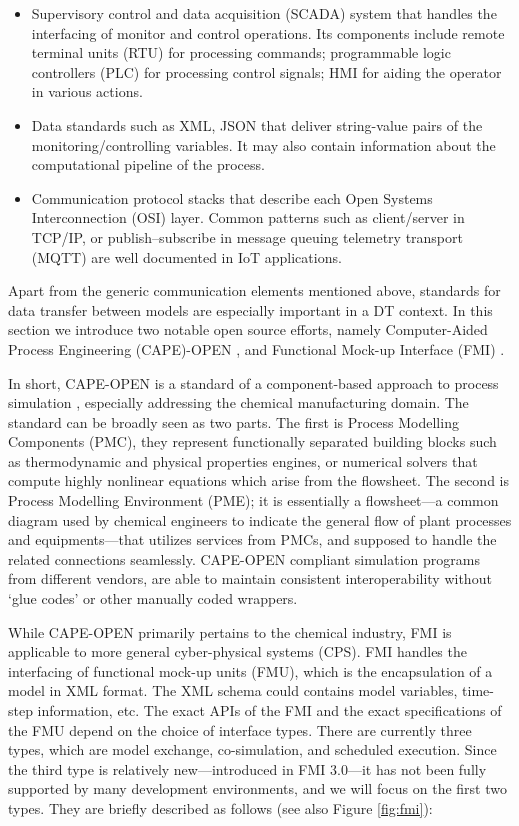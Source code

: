 \documentclass[journal,onecolumn]{IEEEtran} %
\begin{document}
\begin{itemize}

  \item Supervisory control and data acquisition (SCADA) system that handles the interfacing of monitor and control operations. Its components include remote terminal units (RTU) for processing commands; programmable logic controllers (PLC) for processing control signals; HMI for aiding the operator in various actions.
  
  \item Data standards such as XML, JSON that deliver string-value pairs of the monitoring/controlling variables. It may also contain information about the computational pipeline of the process.
  
  \item Communication protocol stacks that describe each Open Systems Interconnection (OSI) layer. Common patterns such as client/server in TCP/IP, or publish–subscribe in message queuing telemetry transport (MQTT) are well documented in IoT applications.
  
\end{itemize}

Apart from the generic communication elements mentioned above, standards for data transfer between models are especially important in a DT context. In this section we introduce two notable open source efforts, namely Computer-Aided Process Engineering (CAPE)-OPEN \cite{capeopen}, and Functional Mock-up Interface (FMI) \cite{fmi} \cite{Blochwitz2011}.

In short, CAPE-OPEN is a standard of a component-based approach to process simulation \cite{Belaud2002}, especially addressing the chemical manufacturing domain. The standard can be broadly seen as two parts. The first is Process Modelling Components (PMC), they represent functionally separated building blocks such as thermodynamic and physical properties engines, or numerical solvers that compute highly nonlinear equations which arise from the flowsheet. The second is Process Modelling Environment (PME); it is essentially a flowsheet---a common diagram used by chemical engineers to indicate the general flow of plant processes and equipments---that utilizes services from PMCs, and supposed to handle the related connections seamlessly. CAPE-OPEN compliant simulation programs from different vendors, are able to maintain consistent interoperability without `glue codes' or other manually coded wrappers. 

While CAPE-OPEN primarily pertains to the chemical industry, FMI is applicable to more general cyber-physical systems (CPS). FMI handles the interfacing of functional mock-up units (FMU), which is the encapsulation of a model in XML format. The XML schema could contains model variables, time-step information, etc. The exact APIs of the FMI and the exact specifications of the FMU depend on the choice of interface types. There are currently three types, which are model exchange, co-simulation, and scheduled execution. Since the third type is relatively new---introduced in FMI 3.0---it has not been fully supported by many development environments, and we will focus on the first two types. They are briefly described as follows (see also Figure \ref{fig:fmi}): 
\end{document}
